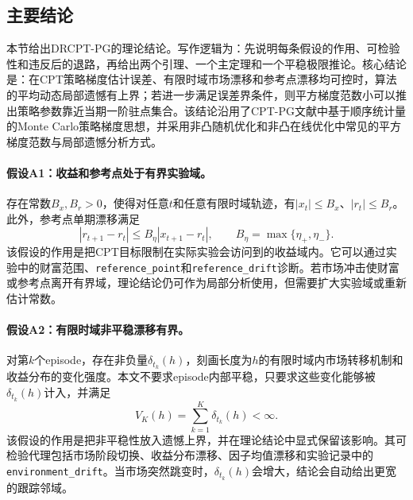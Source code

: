 \subsection{主要结论}
本节给出DRCPT-PG的理论结论。写作逻辑为：先说明每条假设的作用、可检验性和违反后的退路，再给出两个引理、一个主定理和一个平稳极限推论。核心结论是：在CPT策略梯度估计误差、有限时域市场漂移和参考点漂移均可控时，算法的平均动态局部遗憾有上界；若进一步满足误差界条件，则平方梯度范数小可以推出策略参数靠近当期一阶驻点集合。该结论沿用了CPT-PG文献中基于顺序统计量的Monte Carlo策略梯度思想\citep{lepel2026policygradients}，并采用非凸随机优化和非凸在线优化中常见的平方梯度范数与局部遗憾分析方式\citep{ghadimi2013stochastic,hazan2017efficient,aydore2019dynamic,hallak2021regret}。

\paragraph{假设A1：收益和参考点处于有界实验域。}
存在常数$B_x,B_r>0$，使得对任意$t$和任意有限时域轨迹，有$|x_t|\le B_x$、$|r_t|\le B_r$。此外，参考点单期漂移满足
\begin{equation}
\label{eq:a1_ref_drift}
|r_{t+1}-r_t|
\le
B_\eta |x_{t+1}-r_t|,
\qquad
B_\eta=\max\{\eta_+,\eta_-\}.
\end{equation}
该假设的作用是把CPT目标限制在实际实验会访问到的收益域内。它可以通过实验中的财富范围、\texttt{reference\_point}和\texttt{reference\_drift}诊断。若市场冲击使财富或参考点离开有界域，理论结论仍可作为局部分析使用，但需要扩大实验域或重新估计常数。

\paragraph{假设A2：有限时域非平稳漂移有界。}
对第$k$个episode，存在非负量$\delta_{t_k}(h)$，刻画长度为$h$的有限时域内市场转移机制和收益分布的变化强度。本文不要求episode内部平稳，只要求这些变化能够被$\delta_{t_k}(h)$计入，并满足
\begin{equation}
\label{eq:a2_local_drift}
V_K(h)
=
\sum_{k=1}^{K}\delta_{t_k}(h)
<\infty.
\end{equation}
该假设的作用是把非平稳性放入遗憾上界，并在理论结论中显式保留该影响。其可检验代理包括市场阶段切换、收益分布漂移、因子均值漂移和实验记录中的\texttt{environment\_drift}。当市场突然跳变时，$\delta_{t_k}(h)$会增大，结论会自动给出更宽的跟踪邻域。

